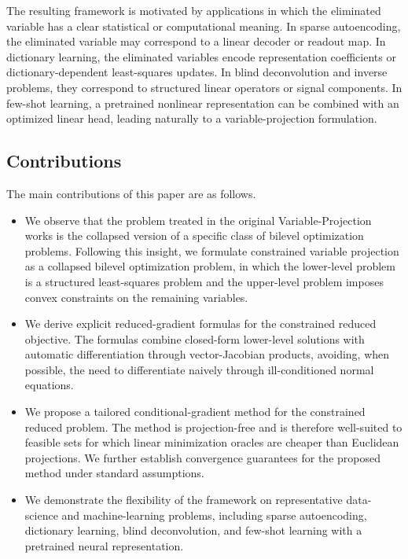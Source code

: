 \documentclass{article}
\begin{document}
The resulting framework is motivated by applications in which the eliminated variable has a clear statistical or computational meaning. In sparse autoencoding, the eliminated variable may correspond to a linear decoder or readout map. In dictionary learning, the eliminated variables encode representation coefficients or dictionary-dependent least-squares updates. In blind deconvolution and inverse problems, they correspond to structured linear operators or signal components. In few-shot learning, a pretrained nonlinear representation can be combined with an optimized linear head, leading naturally to a variable-projection formulation. 

\subsection{Contributions}
The main contributions of this paper are as follows.
\begin{itemize}
    \item We observe that the problem treated in the original Variable-Projection works is the collapsed version of a specific class of bilevel optimization problems. Following this insight, we formulate constrained variable projection as a collapsed bilevel optimization problem, in which the lower-level problem is a structured least-squares problem and the upper-level problem imposes convex constraints on the remaining variables.

    \item We derive explicit reduced-gradient formulas for the constrained reduced objective. The formulas combine closed-form lower-level solutions with automatic differentiation through vector-Jacobian products, avoiding, when possible, the need to differentiate naively through ill-conditioned normal equations.

    \item We propose a tailored conditional-gradient method for the constrained reduced problem. The method is projection-free and is therefore well-suited to feasible sets for which linear minimization oracles are cheaper than Euclidean projections. We further establish convergence guarantees for the proposed method under standard assumptions.

    \item We demonstrate the flexibility of the framework on representative data-science and machine-learning problems, including sparse autoencoding, dictionary learning, blind deconvolution, and few-shot learning with a
    pretrained neural representation.
\end{itemize}
\end{document}
